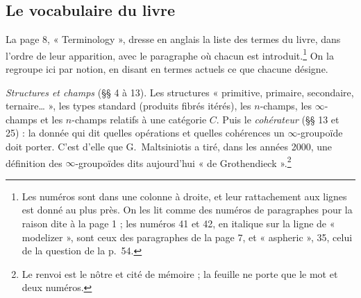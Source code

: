 \documentclass[11pt,a4paper]{article}
\begin{document}
\subsection*{Le vocabulaire du livre}

La page 8, « Terminology », dresse en anglais la liste des termes du livre,
dans l'ordre de leur apparition, avec le paragraphe où chacun est
introduit.\footnote{Les numéros sont dans une colonne à droite, et leur
rattachement aux lignes est donné au plus près. On les lit comme des numéros de
paragraphes pour la raison dite à la page 1 ; les numéros 41 et 42, en
italique sur la ligne de « modelizer », sont ceux des paragraphes de la
page 7, et « aspheric », 35, celui de la question de la p.\ 54.} On la
regroupe ici par notion, en disant en termes actuels ce que chacune désigne.

\emph{Structures et champs} (§§ 4 à 13). Les structures « primitive,
primaire, secondaire, ternaire… », les types standard (produits fibrés
itérés), les $n$-champs, les $\infty$-champs et les $n$-champs relatifs à une
catégorie $C$. Puis le \emph{cohérateur} (§§ 13 et 25) : la donnée qui dit
quelles opérations et quelles cohérences un $\infty$-groupoïde doit porter.
C'est d'elle que G.~Maltsiniotis a tiré, dans les années 2000, une définition
des $\infty$-groupoïdes dits aujourd'hui « de Grothendieck ».\footnote{Le
renvoi est le nôtre et cité de mémoire ; la feuille ne porte que le mot et deux
numéros.}
\end{document}
